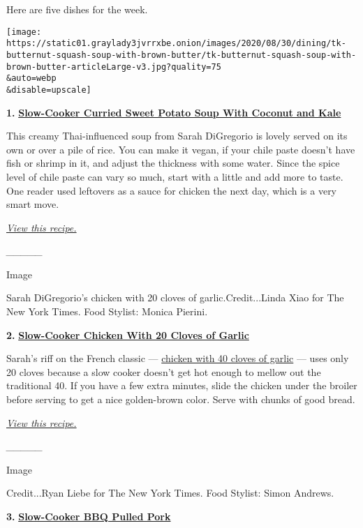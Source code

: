 Here are five dishes for the week.

\texttt{[image: https://static01.graylady3jvrrxbe.onion/images/2020/08/30/dining/tk-butternut-squash-soup-with-brown-butter/tk-butternut-squash-soup-with-brown-butter-articleLarge-v3.jpg?quality=75\\\&auto=webp\\\&disable=upscale]}

\textbf{1.}
\href{https://cooking.nytimes3xbfgragh.onion/recipes/1019695-slow-cooker-coconut-curry-soup-with-sweet-potato-and-kale}{\textbf{Slow-Cooker
Curried Sweet Potato Soup With Coconut and Kale}}

This creamy Thai-influenced soup from Sarah DiGregorio is lovely served
on its own or over a pile of rice. You can make it vegan, if your chile
paste doesn't have fish or shrimp in it, and adjust the thickness with
some water. Since the spice level of chile paste can vary so much, start
with a little and add more to taste. One reader used leftovers as a
sauce for chicken the next day, which is a very smart move.

\href{https://cooking.nytimes3xbfgragh.onion/recipes/1019695-slow-cooker-coconut-curry-soup-with-sweet-potato-and-kale}{\emph{View
this recipe.}}

\emph{\_\_\_\_\_}

Image

Sarah DiGregorio's chicken with 20 cloves of garlic.Credit...Linda Xiao
for The New York Times. Food Stylist: Monica Pierini.

\textbf{2.}
\href{https://cooking.nytimes3xbfgragh.onion/recipes/1020840-slow-cooker-chicken-with-20-cloves-of-garlic}{\textbf{Slow-Cooker
Chicken With 20 Cloves of Garlic}}

Sarah's riff on the French classic ---
\href{https://cooking.nytimes3xbfgragh.onion/recipes/3764-chicken-with-40-cloves-of-garlic}{chicken
with 40 cloves of garlic} --- uses only 20 cloves because a slow cooker
doesn't get hot enough to mellow out the traditional 40. If you have a
few extra minutes, slide the chicken under the broiler before serving to
get a nice golden-brown color. Serve with chunks of good bread.

\emph{\href{https://cooking.nytimes3xbfgragh.onion/recipes/1020840-slow-cooker-chicken-with-20-cloves-of-garlic}{View
this recipe.}}

\emph{\_\_\_\_\_}

Image

Credit...Ryan Liebe for The New York Times. Food Stylist: Simon Andrews.

\textbf{3.}
\href{https://cooking.nytimes3xbfgragh.onion/recipes/1020497-slow-cooker-bbq-pulled-pork}{\textbf{Slow-Cooker
BBQ Pulled Pork}}

